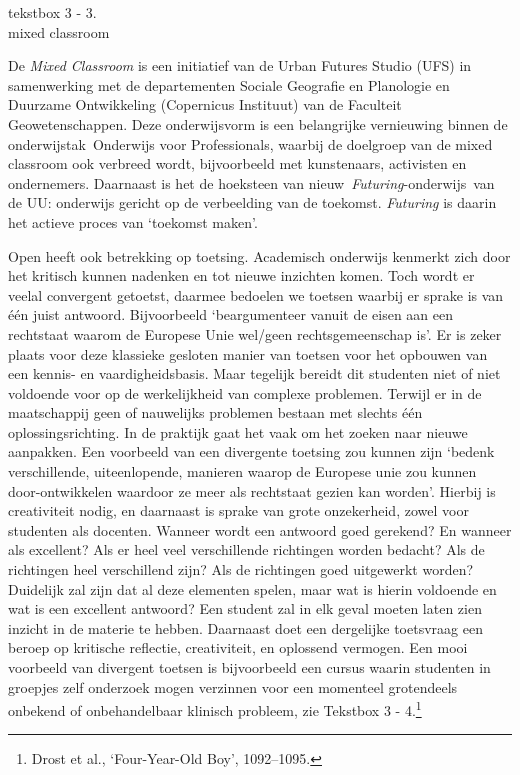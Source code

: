 \documentclass[smallauthor, chapterhaspagenum, nochapterinheader, pagenuminheader,  bigchapnum,medium2, tocpages, garamond, titleinheader]{jote-book}
\begin{document}
\begin{bookbox}{\raggedright tekstbox 3 - 3. \\mixed classroom}
		\vspace*{\baselineskip}

		De \emph{Mixed Classroom} is een initiatief van de Urban Futures Studio (UFS) in samenwerking met de departementen Sociale Geografie en Planologie en Duurzame Ontwikkeling (Copernicus Instituut) van de Faculteit Geowetenschappen. Deze onderwijsvorm is een belangrijke vernieuwing binnen de onderwijstak Onderwijs voor Professionals, waarbij de doelgroep van de mixed classroom ook verbreed wordt, bijvoorbeeld met kunstenaars, activisten en ondernemers. Daarnaast is het de hoeksteen van nieuw \emph{Futuring}-onderwijs van de UU: onderwijs gericht op de verbeelding van de toekomst. \emph{Futuring} is daarin het actieve proces van ‘toekomst maken'.
	\end{bookbox}

	Open heeft ook betrekking op toetsing. Academisch onderwijs kenmerkt zich door het kritisch kunnen nadenken en tot nieuwe inzichten komen. Toch wordt er veelal convergent getoetst, daarmee bedoelen we toetsen waarbij er sprake is van één juist antwoord. Bijvoorbeeld ‘beargumenteer vanuit de eisen aan een rechtstaat waarom de Europese Unie wel/geen rechtsgemeenschap is'. Er is zeker plaats voor deze klassieke gesloten manier van toetsen voor het opbouwen van een kennis- en vaardigheidsbasis. Maar tegelijk bereidt dit studenten niet of niet voldoende voor op de werkelijkheid van complexe problemen. Terwijl er in de maatschappij geen of nauwelijks problemen bestaan met slechts één oplossingsrichting. In de praktijk gaat het vaak om het zoeken naar nieuwe aanpakken. Een voorbeeld van een divergente toetsing zou kunnen zijn ‘bedenk verschillende, uiteenlopende, manieren waarop de Europese unie zou kunnen door-ontwikkelen waardoor ze meer als rechtstaat gezien kan worden'. Hierbij is creativiteit nodig, en daarnaast is sprake van grote onzekerheid, zowel voor studenten als docenten. Wanneer wordt een antwoord goed gerekend? En wanneer als excellent? Als er heel veel verschillende richtingen worden bedacht? Als de richtingen heel verschillend zijn? Als de richtingen goed uitgewerkt worden? Duidelijk zal zijn dat al deze elementen spelen, maar wat is hierin voldoende en wat is een excellent antwoord? Een student zal in elk geval moeten laten zien inzicht in de materie te hebben. Daarnaast doet een dergelijke toetsvraag een beroep op kritische reflectie, creativiteit, en oplossend vermogen. Een mooi voorbeeld van divergent toetsen is bijvoorbeeld een cursus waarin studenten in groepjes zelf onderzoek mogen verzinnen voor een momenteel grotendeels onbekend of onbehandelbaar klinisch probleem, zie Tekstbox 3 - 4.\footnote{Drost et al., ‘Four-Year-Old Boy', 1092--1095.}
\end{document}
